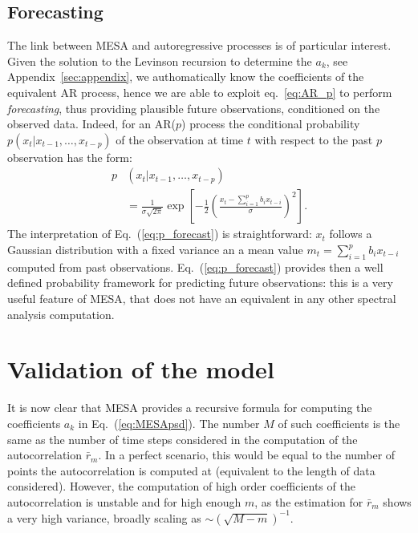\documentclass[twocolumn,showpacs,preprintnumbers,nofootinbib,prd,
superscriptaddress,10pt]{revtex4-1}
\begin{document}
\subsection{Forecasting} \label{sec:forecasting}
The link between MESA and autoregressive processes is of particular interest. Given the solution to the Levinson recursion to determine the $a_k$, see Appendix~\ref{sec:appendix}, we authomatically know the coefficients of the equivalent AR process, hence we are able to exploit eq.~\ref{eq:AR_p} to perform \emph{forecasting}, thus providing plausible future observations, conditioned on the observed data.
Indeed, for an AR($p$) process the conditional probability $p(x_t|x_{t-1}, \ldots , x_{t-p})$ of the observation at time $t$ with respect to the past $p$ observation has the form:
\begin{align}\label{eq:p_forecast}
	p&(x_t|x_{t-1}, \ldots , x_{t-p}) \nonumber\\
	&= \frac{1}{\sigma\sqrt{2\pi}} \exp\left[-\frac{1}{2} \left(\frac{x_t - \sum_{i = 1}^p b_i x_{t-i}}{\sigma}\right)^2\right].
\end{align}
The interpretation of Eq.~(\ref{eq:p_forecast}) is straightforward: $x_t$ follows a Gaussian distribution with a fixed variance an a mean value $m_t = \sum_{i = 1}^p b_i x_{t-i}$ computed from past observations.
Eq.~(\ref{eq:p_forecast}) provides then a well defined probability framework for predicting future observations: this is a very useful feature of MESA, that does not have an equivalent in any other spectral analysis computation.

\section{Validation of the model}\label{sec:validation}
It is now clear that MESA provides a recursive formula for computing the coefficients $a_k$ in Eq.~(\ref{eq:MESApsd}). The number $M$ of such coefficients is the same as the number of time steps considered in the computation of the autocorrelation $\bar{r}_m$. In a perfect scenario, this would be equal to the number of points the autocorrelation is computed at (equivalent to the length of data considered). However, the computation of high order coefficients of the autocorrelation is unstable and for high enough $m$, as the estimation for  $\bar{r}_m$ shows a very high variance, broadly scaling as $\sim \left(\sqrt{M - m}\right)^{-1}$.

\end{document}
